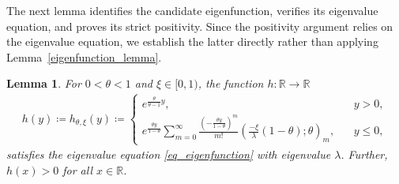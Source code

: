 \documentclass[12pt]{article}
\newcommand{\R}{\mathbb{R}} %
\newcommand{\1}{\mathds{1}}
\theoremstyle{definition}
\theoremstyle{plain}
\newtheorem{Lemma}[definition]{Lemma}
\theoremstyle{remark}
\begin{document}
The next lemma identifies the candidate eigenfunction, verifies its
eigenvalue equation, and proves its strict positivity. Since the
positivity argument relies on the eigenvalue equation, we establish
the latter directly rather than applying
Lemma~\ref{eigenfunction_lemma}.
\begin{Lemma}\label{h_eigenfct_pos_theta}
    For $0<\theta<1$ and $\xi\in[0,1)$, the function $h:\R\to\R$
    \begin{align}\label{def_h_pos_theta_2}
     h(y)\coloneqq h_{\theta,\xi}(y)\coloneqq  \begin{cases}
          e^{\frac{\theta}{\theta-1}y},~~~&y>0,
          \\e^{\frac{\theta y}{1-\theta}}\sum_{m=0}^\infty\frac{\left(-\frac{\theta y}{1-\theta}\right)^m}{m!}\left(\frac{-\xi}{\lambda}(1-\theta);\theta\right)_m,~~~~&y\le 0,
      \end{cases}
  \end{align}
  satisfies the eigenvalue equation \eqref{eq_eigenfunction} with eigenvalue $\lambda$. Further,  $h(x)>0$ for all $x\in\R$.
\end{Lemma}
\end{document}
